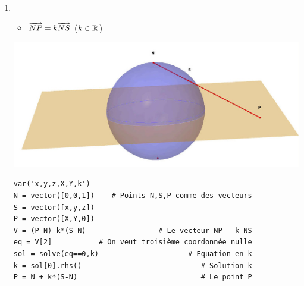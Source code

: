 \begin{frame}[fragile]
\begin{enumerate}
  \item ~

\vspace*{-3ex}
  
\begin{minipage}{0.53\textwidth}
\begin{itemize}
  \item $\overrightarrow{NP} = k \overrightarrow{NS}$ ($k\in \mathbb{R}$)
  
\end{itemize}
\end{minipage} 
\begin{minipage}{0.3\textwidth}
\begin{center}
  \includegraphics[scale=0.13]{figures/stereo1bis.jpg} 
\end{center}
\end{minipage}  
 
\vspace*{-1ex} 
\pause\pause\pause\pause
 
\begin{algo}
\begin{lstlisting}  
var('x,y,z,X,Y,k')              
N = vector([0,0,1])    # Points N,S,P comme des vecteurs
S = vector([x,y,z])
P = vector([X,Y,0])
V = (P-N)-k*(S-N)                 # Le vecteur NP - k NS 
eq = V[2]           # On veut troisième coordonnée nulle
sol = solve(eq==0,k)                     # Equation en k
k = sol[0].rhs()                            # Solution k
P = N + k*(S-N)                             # Le point P
\end{lstlisting}
\end{algo} 

\end{enumerate}

\end{frame}  
  
